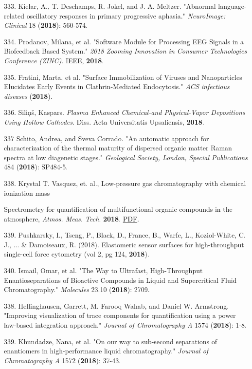 333. Kielar, A., T. Deschamps, R. Jokel, and J. A. Meltzer. "Abnormal language-related oscillatory responses in primary progressive aphasia." \textit{NeuroImage: Clinical} 18 (\textbf{2018}): 560-574.

334. Prodanov, Milana, et al. "Software Module for Processing EEG Signals in a Biofeedback Based System." \textit{2018 Zooming Innovation in Consumer Technologies Conference (ZINC)}. IEEE, \textbf{2018}.

335. Fratini, Marta, et al. "Surface Immobilization of Viruses and Nanoparticles Elucidates Early Events in Clathrin-Mediated Endocytosis." \textit{ACS infectious diseases} (\textbf{2018}).

336. Sili\c{n}\v{s}, Kaspars. \textit{Plasma Enhanced Chemical-and Physical-Vapor Depositions Using Hollow Cathodes}. Diss. Acta Universitatis Upsaliensis, \textbf{2018}.

337 Schito, Andrea, and Sveva Corrado. "An automatic approach for characterization of the thermal maturity of dispersed organic matter Raman spectra at low diagenetic stages." \textit{Geological Society, London, Special Publications} 484 (\textbf{2018}): SP484-5.

338. Krystal T. Vasquez, et. al., Low-pressure gas chromatography with chemical ionization mass

Spectrometry for quantification of multifunctional organic compounds in the atmosphere, \textit{Atmos. Meas. Tech}. \textbf{2018}. \href{https://www.atmos-meas-tech-discuss.net/amt-2018-223/amt-2018-223.pdf}{PDF}.

339. Pushkarsky, I., Tseng, P., Black, D., France, B., Warfe, L., Koziol-White, C. J., ... \& Damoiseaux, R. (2018). Elastomeric sensor surfaces for high-throughput single-cell force cytometry (vol 2, pg 124, \textbf{2018}).

340. Ismail, Omar, et al. "The Way to Ultrafast, High-Throughput Enantioseparations of Bioactive Compounds in Liquid and Supercritical Fluid Chromatography." \textit{Molecules} 23.10 (\textbf{2018}): 2709.

338. Hellinghausen, Garrett, M. Farooq Wahab, and Daniel W. Armstrong. "Improving visualization of trace components for quantification using a power law-based integration approach." \textit{Journal of Chromatography A} 1574 (\textbf{2018}): 1-8.

339. Khundadze, Nana, et al. "On our way to sub-second separations of enantiomers in high-performance liquid chromatography." \textit{Journal of Chromatography A} 1572 (\textbf{2018}): 37-43.


